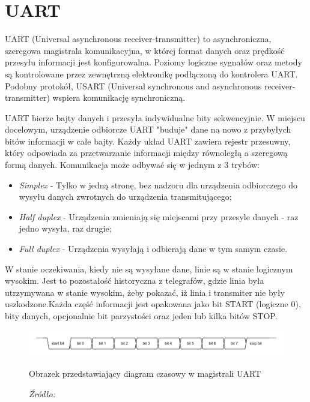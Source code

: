 \documentclass[12pt,a4paper,oneside]{memoir}
\begin{document}
\section{UART}
\par UART (Universal asynchronous receiver-transmitter) \cite{uartwiki} to asynchroniczna, szeregowa magistrala komunikacyjna, w której format danych oraz prędkość przesyłu informacji jest konfigurowalna. Poziomy logiczne sygnałów oraz metody są kontrolowane przez zewnętrzną elektronikę podłączoną do kontrolera UART. Podobny protokół, USART (Universal synchronous and asynchronous receiver-transmitter) wspiera komunikację synchroniczną.
\par UART bierze bajty danych i przesyła indywidualne bity sekwencyjnie. W miejscu docelowym, urządzenie odbiorcze UART "buduje" dane na nowo z przybyłych bitów informacji w całe bajty. Każdy układ UART zawiera rejestr przesuwny, który odpowiada za przetwarzanie informacji między równoległą  a szeregową formą danych. Komunikacja może odbywać się w jednym z 3 trybów:
\begin{itemize}
	\item \textit{Simplex} - Tylko w jedną stronę, bez nadzoru dla urządzenia odbiorczego do wysyłu danych zwrotnych do urządzenia transmitującego;
	\item \textit{Half duplex} - Urządzenia zmieniają się miejscami przy przesyle danych - raz jedno wysyła, raz drugie;
	\item \textit{Full duplex} - Urządzenia wysyłają i odbierają dane w tym samym czasie.
\end{itemize}
\par W stanie oczekiwania, kiedy nie są wysyłane dane, linie są w stanie logicznym wysokim. Jest to pozostałość historyczna z telegrafów, gdzie linia była utrzymywana w stanie wysokim, żeby pokazać, iż linia i transmiter nie były uszkodzone.Każda część informacji jest opakowana jako bit START (logiczne 0), bity danych, opcjonalnie bit parzystości oraz jeden lub kilka bitów STOP.
\begin{figure}[!h]
	\centering
	\includegraphics[scale=0.45]{images/uart-timing-diagram.png}
	{\tytulyrozdzialow \footnotesize \caption[UART - Diagram czasowy] {Obrazek przedstawiający diagram czasowy w magistrali UART}}
	\caption*{\textit{Źródło: \cite{uartwiki}}}
\end{figure}
\end{document}
